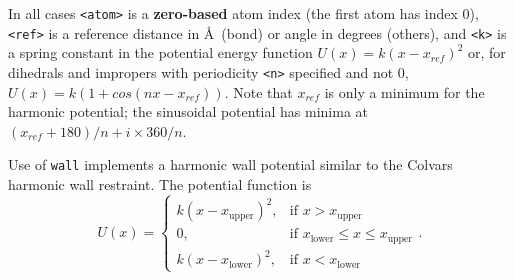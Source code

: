In all cases {\tt <atom>} is a {\bf zero-based} atom index
(the first atom has index 0),
{\tt <ref>} is a reference distance in \AA\ (bond) or angle in degrees (others),
and {\tt <k>} is a spring constant in the potential energy function
$U(x) = k (x-x_{ref})^2$ or, for dihedrals and impropers with 
periodicity {\tt <n>} specified and not 0, $U(x) = k (1 + cos(n x - x_{ref}))$.
Note that $x_{ref}$ is only a minimum for the harmonic potential;
the sinusoidal potential has minima at $(x_{ref} + 180)/n + i \times 360/n$.

Use of {\tt wall} implements a harmonic wall potential similar to
the Colvars harmonic wall restraint. The potential function is
$$
U(x) =
\begin{cases}
        k(x-x_{\text{upper}})^2, &\text{if $x > x_{\text{upper}}$} \\
        0, &\text{if $x_{\text{lower}} \leq x \leq x_{\text{upper}}$} \\
        k(x-x_{\text{lower}})^2, &\text{if $x < x_{\text{lower}}$}
\end{cases}.
$$

